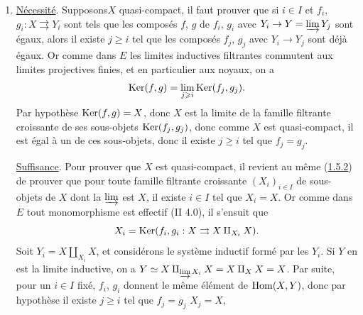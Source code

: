 \documentclass[10pt]{../fichiers-configuration-latex/smfart}
\begin{document}
\begin{enumerate}
\renewcommand{\theenumi}{\roman{enumi}}
\renewcommand{\labelenumi}{(\theenumi)}
\item \underline{Nécessité}.
Supposons\pageoriginale $X$ quasi-compact, il faut prouver que
  si $i\in I$ et $f_i$, $g_i : X \rightrightarrows Y_i$ sont tels que
  les composés $f$, $g$ de $f_i$, $g_i$ avec $Y_i \to Y = \varinjlim
  Y_j$ sont égaux, alors il existe $j \geq i$ tel que les composés
  $f_j$, $g_j$ avec $Y_i \to Y_j$ sont déjà égaux. Or comme dans $E$
  les limites inductives filtrantes commutent aux limites projectives
  finies, et en particulier aux noyaux, on a
$$
\operatorname{Ker} (f, g) = \mathop{\lim}_{j\geqslant i} \operatorname{Ker} (f_j, g_j){}.
$$
Par hypothèse $\operatorname{Ker}(f, g) = X$, donc $X$ est la limite de la famille
filtrante croissante de ses sous-objets $\operatorname{Ker}(f_j, g_j)$, donc comme
$X$ est quasi-compact, il est égal à un de ces sous-objets, donc il
existe $j \geq i$ tel que $f_j = g_{j}$.

\underline{Suffisance}. Pour prouver que $X$ est quasi-compact, il revient au
même (\hyperref[VI.subsubsec1.5.2]{1.5.2}) de prouver que pour toute famille filtrante croissante
$(X_i)_{i \in I}$ de sous-objets de $X$ dont la $\varinjlim$ est $X$,
il existe $i \in I$ tel que $X_i = X$. Or comme dans $E$ tout
monomorphisme est effectif (II 4.0), il s'ensuit que
$$
X_i = \operatorname{Ker} (f_i, g_i : X \rightrightarrows X \amalg_{X_{i}} X){}.
$$
Soit $Y_i = X \amalg_{X_i} X$, et considérons le système inductif formé
par les $Y_i$. Si $Y$ en est la limite inductive, on a $Y \simeq X
\amalg_{\varinjlim X_i} X = X \amalg_X X = X$.
Par suite, pour un $i \in I$ fixé, $f_i$, $g_i$ donnent le
même élément de $\operatorname{Hom}(X, Y)$, donc par hypothèse il existe $j \geq i$
tel que $f_j = g_j$ \ie $X_j = X$, \cqfd


\end{enumerate}
\end{document}
